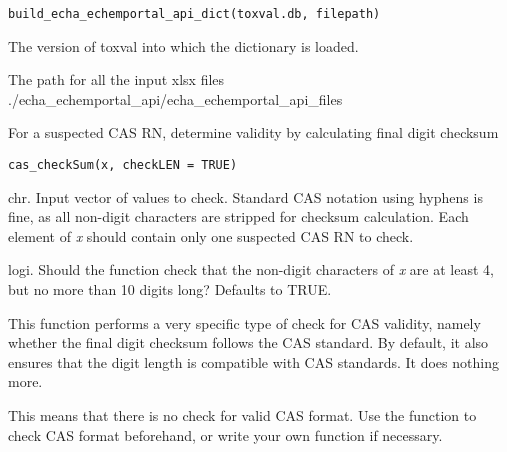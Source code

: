 \documentclass[letterpaper]{book}
\begin{document}
%
\begin{Usage}
\begin{verbatim}
build_echa_echemportal_api_dict(toxval.db, filepath)
\end{verbatim}
\end{Usage}
%
\begin{Arguments}
\begin{ldescription}
\item[\code{toxval.db}] The version of toxval into which the dictionary is loaded.

\item[\code{filepath}] The path for all the input xlsx files ./echa\_echemportal\_api/echa\_echemportal\_api\_files
\end{ldescription}
\end{Arguments}
%
\begin{Description}\relax
For a suspected CAS RN, determine validity by calculating final digit checksum
\end{Description}
%
\begin{Usage}
\begin{verbatim}
cas_checkSum(x, checkLEN = TRUE)
\end{verbatim}
\end{Usage}
%
\begin{Arguments}
\begin{ldescription}
\item[\code{x}] chr. Input vector of values to check. Standard CAS notation using hyphens is fine, as
all non-digit characters are stripped for checksum calculation. Each element of \emph{x} should contain
only one suspected CAS RN to check.

\item[\code{checkLEN}] logi. Should the function check that the non-digit characters of \emph{x} are at least 4, but no
more than 10 digits long? Defaults to TRUE.
\end{ldescription}
\end{Arguments}
%
\begin{Details}\relax
This function performs a very specific type of check for CAS validity, namely whether the final digit checksum follows
the CAS standard. By default, it also ensures that the digit length is compatible with CAS standards. It does nothing
more.

This means that there is no check for valid CAS format. Use the  function to check CAS
format beforehand, or write your own function if necessary.
\end{Details}
\end{document}
